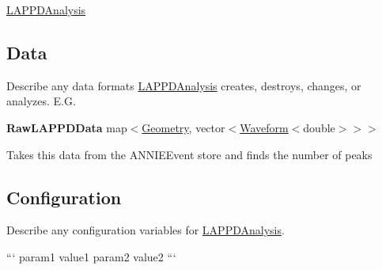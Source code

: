 \hyperlink{classLAPPDAnalysis}{L\-A\-P\-P\-D\-Analysis}

\subsection*{Data}

Describe any data formats \hyperlink{classLAPPDAnalysis}{L\-A\-P\-P\-D\-Analysis} creates, destroys, changes, or analyzes. E.\-G.

{\bfseries Raw\-L\-A\-P\-P\-D\-Data} {\ttfamily map$<$\hyperlink{classGeometry}{Geometry}, vector$<$\hyperlink{classWaveform}{Waveform}$<$double$>$$>$$>$}
\begin{DoxyItemize}
\item Takes this data from the {\ttfamily A\-N\-N\-I\-E\-Event} store and finds the number of peaks
\end{DoxyItemize}

\subsection*{Configuration}

Describe any configuration variables for \hyperlink{classLAPPDAnalysis}{L\-A\-P\-P\-D\-Analysis}.

``` param1 value1 param2 value2 ``` 
